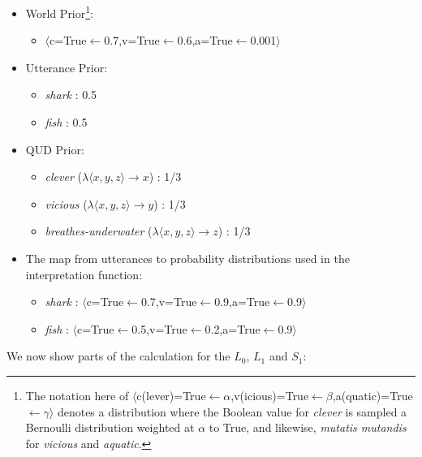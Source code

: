 \documentclass[10pt,letterpaper,twocolumn]{article}
\begin{document}
\begin{itemize}
\item World Prior\footnote{The notation here of $\langle$c(lever)=True$\leftarrow\alpha$,v(icious)=True$\leftarrow\beta$,a(quatic)=True$\leftarrow\gamma\rangle$ denotes a distribution where the Boolean value for \emph{clever} is sampled a Bernoulli distribution weighted at $\alpha$ to True, and likewise, \emph{mutatis mutandis} for \emph{vicious} and \emph{aquatic}.}: 

\begin{itemize}

\item $\langle$c=True$\leftarrow$0.7,v=True$\leftarrow$0.6,a=True$\leftarrow$0.001$\rangle$
\end{itemize}
\item Utterance Prior:
\begin{itemize}
	\item \emph{shark} : 0.5
	\item \emph{fish} : 0.5
\end{itemize}
\item QUD Prior:
\begin{itemize}
\item \emph{clever} ($\lambda \langle x,y,z\rangle \to x$) : 1/3
\item \emph{vicious} ($\lambda \langle x,y,z\rangle \to y$) : 1/3
\item \emph{breathes-underwater} ($\lambda \langle x,y,z\rangle \to z$) : 1/3
\end{itemize}
\item The map from utterances to probability distributions used in the interpretation function:
\begin{itemize}
\item \emph{shark} : $\langle$c=True$\leftarrow$0.7,v=True$\leftarrow$0.9,a=True$\leftarrow$0.9$\rangle$
\item \emph{fish} : $\langle$c=True$\leftarrow$0.5,v=True$\leftarrow$0.2,a=True$\leftarrow$0.9$\rangle$
\end{itemize}
\end{itemize}

We now show parts of the calculation for the $L_0$, $L_1$ and $S_1$:
\end{document}

